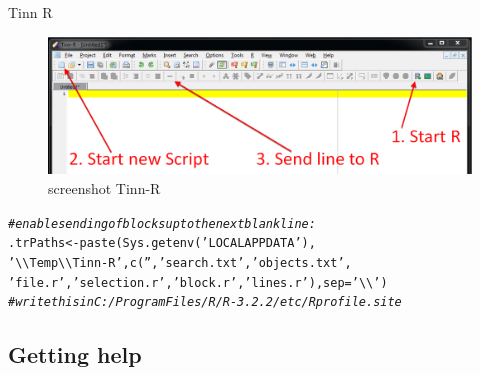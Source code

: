 \documentclass[xcolor=table,           xcolor=dvipsnames]{beamer}\usepackage[]{graphicx}\usepackage[]{color}
\makeatletter
\newcommand{\hlstr}[1]{\textcolor[rgb]{0.545,0.137,0.137}{#1}}
\newcommand{\hlcom}[1]{\textcolor[rgb]{0,0.392,0}{\textit{#1}}}
\newcommand{\hlstd}[1]{\textcolor[rgb]{0,0,0}{#1}}
\newcommand{\hlkwb}[1]{\textcolor[rgb]{0,0,0}{#1}}
\newcommand{\hlkwc}[1]{\textcolor[rgb]{1,0,1}{#1}}
\newcommand{\hlkwd}[1]{\textcolor[rgb]{0,0,1}{#1}}
\newenvironment{kframe}{%
 \def\at@end@of@kframe{}%
 \ifinner\ifhmode%
  \def\at@end@of@kframe{\end{minipage}}%
  \begin{minipage}{\columnwidth}%
 \fi\fi%
 \def\FrameCommand##1{\hskip\@totalleftmargin \hskip-\fboxsep
 \colorbox{shadecolor}{##1}\hskip-\fboxsep
     \hskip-\linewidth \hskip-\@totalleftmargin \hskip\columnwidth}%
 \MakeFramed {\advance\hsize-\width
   \@totalleftmargin\z@ \linewidth\hsize
   \@setminipage}}%
 {\par\unskip\endMakeFramed%
 \at@end@of@kframe}
\newenvironment{knitrout}{}{} %
\makeatother
\begin{document}
\begin{frame}[fragile]{Tinn R}
  \begin{figure}[h]
    \begin{center}
    \includegraphics[width=.8\linewidth]{./externalfig/TinnR_gui.png}
		\caption{screenshot Tinn-R}
		\label{fig:how to start R from Tinn-R}
    \end{center}
	\end{figure}
\begin{knitrout}\scriptsize
{}\color{fgcolor}\begin{kframe}
\begin{alltt}
\hlcom{# enable sending of blocks up to the next blank line:}
\hlstd{.trPaths} \hlkwb{<-} \hlkwd{paste}\hlstd{(}\hlkwd{Sys.getenv}\hlstd{(}\hlstr{'LOCALAPPDATA'}\hlstd{),}
\hlstr{'\textbackslash{}\textbackslash{}Temp\textbackslash{}\textbackslash{}Tinn-R'}\hlstd{,} \hlkwd{c}\hlstd{(}\hlstr{''}\hlstd{,} \hlstr{'search.txt'}\hlstd{,} \hlstr{'objects.txt'}\hlstd{,}
\hlstr{'file.r'}\hlstd{,} \hlstr{'selection.r'}\hlstd{,} \hlstr{'block.r'}\hlstd{,}\hlstr{'lines.r'}\hlstd{),}\hlkwc{sep}\hlstd{=}\hlstr{'\textbackslash{}\textbackslash{}'}\hlstd{)}
\hlcom{# write this in  C:/Program Files/R/R-3.2.2/etc/Rprofile.site}
\end{alltt}
\end{kframe}
\end{knitrout}
\end{frame}

\subsection{Getting help}
\end{document}
